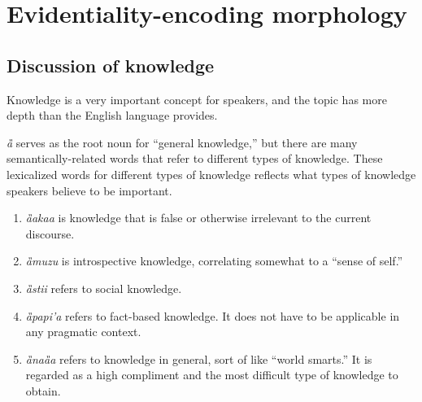 \section{Evidentiality-encoding morphology}




\subsection{Discussion of knowledge}
	Knowledge is a very important concept for {\kurango} speakers, and the topic has more depth than the English language provides.

	\emph{\G a} serves as the root noun for ``general knowledge,'' but there are many semantically-related words that refer to different types of knowledge. These lexicalized words for different types of knowledge reflects what types of knowledge {\kurango} speakers believe to be important.
		\begin{enumerate}
			\item \emph{\G a\N aka\M a} is knowledge that is false or otherwise irrelevant to the current discourse.
			\item \emph{\G amuzu} is introspective knowledge, correlating somewhat to a ``sense of self.''
			\item \emph{\G as\OO t\OO\R ii} refers to social knowledge.
			\item \emph{\G apapi'a} refers to fact-based knowledge. It does not have to be applicable in any pragmatic context.
			\item \emph{\G ana\G aa} refers to knowledge in general, sort of like ``world smarts.'' It is regarded as a high compliment and the most difficult type of knowledge to obtain.
		\end{enumerate}

